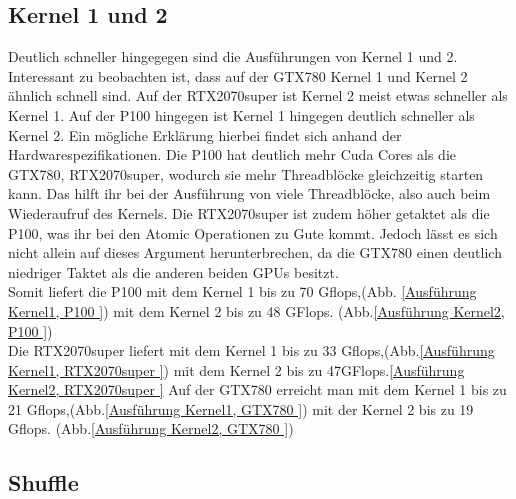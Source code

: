 \documentclass[10pt,a4paper]{article}
\begin{document}
	  \subsection{Kernel 1 und 2}
	 Deutlich schneller hingegegen sind die Ausführungen von Kernel 1 und 2.
	 Interessant zu beobachten ist, dass auf der GTX780 Kernel 1 und Kernel 2 ähnlich schnell sind. Auf der RTX2070super ist Kernel 2 meist etwas schneller als Kernel 1. Auf der P100 hingegen ist Kernel 1 hingegen deutlich schneller als Kernel 2. Ein mögliche Erklärung hierbei findet sich anhand der Hardwarespezifikationen. Die P100 hat deutlich mehr Cuda Cores als die GTX780, RTX2070super, wodurch sie mehr Threadblöcke gleichzeitig starten kann. Das hilft ihr bei der Ausführung von viele Threadblöcke, also auch beim Wiederaufruf des Kernels. Die RTX2070super ist zudem höher getaktet als die P100, was ihr bei den Atomic Operationen zu Gute kommt. Jedoch lässt es sich nicht allein auf dieses Argument herunterbrechen, da die GTX780 einen deutlich niedriger Taktet als die anderen beiden GPUs besitzt.\\
	 Somit liefert die P100 mit dem Kernel 1 bis zu 70 Gflops,(Abb. \ref{Ausführung Kernel1, P100 }) mit dem Kernel 2 bis zu 48 GFlops. (Abb.\ref{Ausführung Kernel2, P100 })\\
	 Die RTX2070super liefert mit dem Kernel 1 bis zu 33 Gflops,(Abb.\ref{Ausführung Kernel1, RTX2070super }) mit dem Kernel 2 bis zu 47GFlops.\ref{Ausführung Kernel2, RTX2070super }
	 Auf der GTX780 erreicht man mit dem Kernel 1 bis zu 21 Gflops,(Abb.\ref{Ausführung Kernel1, GTX780 }) mit der Kernel 2 bis zu 19  Gflops. (Abb.\ref{Ausführung Kernel2, GTX780 })
	 
	 \subsection{Shuffle}
\end{document}
